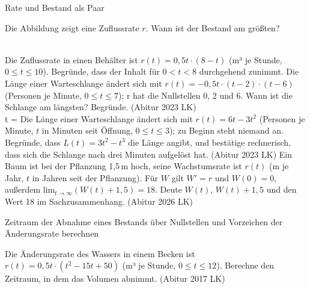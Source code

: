 \setcounter{aufgabe}{10}

\begin{aufgabe}{Rate und Bestand als Paar}
\begin{teile}
\teil Die Abbildung zeigt eine Zuflussrate $r$. Wann ist der Bestand am größten? \\  \\ 

\begin{ksys}[xmin=0,xmax=8,ymin=-3,ymax=2,xlabel=t,ylabel=r,ablesen]  \end{ksys}
\teil Die Zuflussrate in einen Behälter ist $r(t) = 0{,}5t \cdot (8 - t)$ (m³ je Stunde, $0 \le t \le 10$). Begründe, dass der Inhalt für $0 < t < 8$ durchgehend zunimmt.
\teil Die Länge einer Warteschlange ändert sich mit $r(t) = -0{,}5t \cdot (t - 2) \cdot (t - 6)$ (Personen je Minute, $0 \le t \le 7$); r hat die Nullstellen 0, 2 und 6. Wann ist die Schlange am längsten? Begründe. \hfill (Abitur 2023 LK) \\ t = \leerfeld
\teil Die Länge einer Warteschlange ändert sich mit $r(t) = 6t - 3t^2$ (Personen je Minute, $t$ in Minuten seit Öffnung, $0 \le t \le 3$); zu Beginn steht niemand an. Begründe, dass $L(t) = 3t^2 - t^3$ die Länge angibt, und bestätige rechnerisch, dass sich die Schlange nach drei Minuten aufgelöst hat. \hfill (Abitur 2023 LK)
\teil Ein Baum ist bei der Pflanzung 1{,}5\,m hoch, seine Wachstumsrate ist $r(t)$ (m je Jahr, $t$ in Jahren seit der Pflanzung). Für $W$ gilt $W' = r$ und $W(0) = 0$, außerdem $\mathrm{lim}_{t \to \infty} (W(t) + 1{,}5) = 18$. Deute $W(t)$, $W(t) + 1{,}5$ und den Wert 18 im Sachzusammenhang. \hfill (Abitur 2026 LK)
\end{teile}
\end{aufgabe}

\begin{aufgabe}{Zeitraum der Abnahme eines Bestands über Nullstellen und Vorzeichen der Änderungsrate berechnen}
\begin{teile}
\teil Die Änderungsrate des Wassers in einem Becken ist $r(t) = 0{,}5t \cdot (t^2 - 15t + 50)$ (m³ je Stunde, $0 \le t \le 12$). Berechne den Zeitraum, in dem das Volumen abnimmt. \hfill (Abitur 2017 LK)
\end{teile}
\end{aufgabe}

